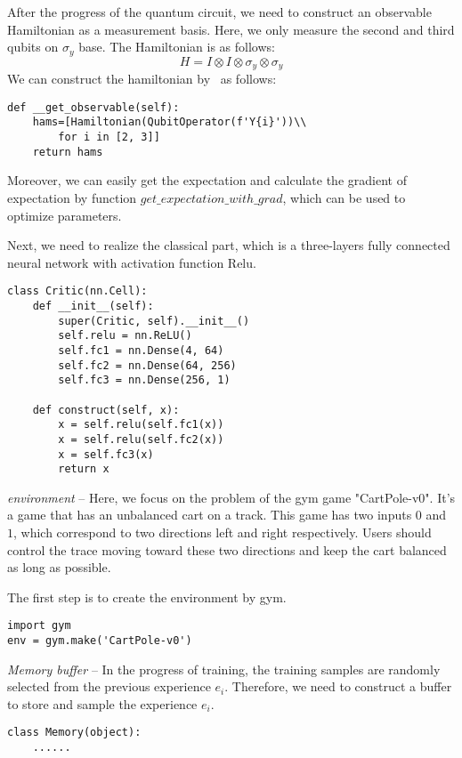After the progress of the quantum circuit, we need to construct an observable Hamiltonian as a measurement basis. Here, we only measure the second and third qubits on $\sigma_y$ base. The Hamiltonian is as follows:
\begin{equation}
    H=I\otimes I\otimes\sigma_y\otimes\sigma_y
\end{equation}
We can construct the hamiltonian by \MindQuantum\ as follows:
\begin{lstlisting}
def __get_observable(self):
    hams=[Hamiltonian(QubitOperator(f'Y{i}'))\\
        for i in [2, 3]]
    return hams
\end{lstlisting}
Moreover, we can easily get the expectation and calculate the gradient of expectation by function $get\_expectation\_with\_grad$, which can be used to optimize parameters.

Next, we need to realize the classical part, which is a three-layers fully connected neural network with activation function Relu.
\begin{lstlisting}
class Critic(nn.Cell):
    def __init__(self):
        super(Critic, self).__init__()
        self.relu = nn.ReLU()
        self.fc1 = nn.Dense(4, 64)
        self.fc2 = nn.Dense(64, 256)
        self.fc3 = nn.Dense(256, 1)

    def construct(self, x):
        x = self.relu(self.fc1(x))
        x = self.relu(self.fc2(x))
        x = self.fc3(x)
        return x
\end{lstlisting}

\textit{environment} -- Here, we focus on the problem of the gym game "CartPole-v0". It's a game that has an unbalanced cart on a track. This game has two inputs $0$ and $1$, which correspond to two directions left and right respectively. Users should control the trace moving toward these two directions and keep the cart balanced as long as possible.

The first step is to create the environment by gym.
\begin{lstlisting}
import gym
env = gym.make('CartPole-v0')
\end{lstlisting}
\textit{Memory buffer} -- In the progress of training, the training samples are randomly selected from the previous experience $e_i$. Therefore, we need to construct a buffer to store and sample the experience $e_i$.
\begin{lstlisting}
class Memory(object):
    ......
\end{lstlisting}

